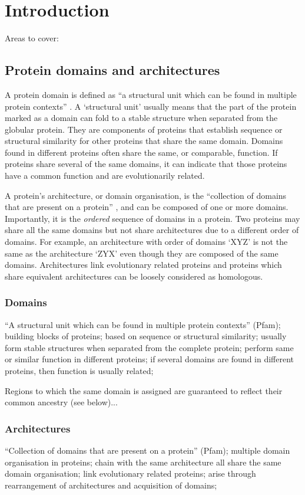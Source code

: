 \section{Introduction}

Areas to cover:

\subsection{Protein domains and architectures}
A protein domain is defined as ``a structural unit which can be found in multiple protein contexts'' \cite{pfamdb}. A `structural unit' usually means that the part of the protein marked as a domain can fold to a stable structure when separated from the globular protein. They are components of proteins that establish sequence or structural similarity for other proteins that share the same domain. Domains found in different proteins often share the same, or comparable, function. If proteins share several of the same domains, it can indicate that those proteins have a common function and are evolutionarily related.

A protein's architecture, or domain organisation, is the ``collection of domains that are present on a protein'' \cite{pfamdb}, and can be composed of one or more domains. Importantly, it is the \textit{ordered} sequence of domains in a protein. Two proteins may share all the same domains but not share architectures due to a different order of domains. For example, an architecture with order of domains `XYZ' is not the same as the architecture `ZYX' even though they are composed of the same domains. Architectures link evolutionary related proteins \cite{fong} and proteins which share equivalent architectures can be loosely considered as homologous. 

\subsubsection*{Domains} ``A structural unit which can be found in multiple protein contexts'' (Pfam); building blocks of proteins; based on sequence or structural similarity; usually form stable structures when separated from the complete protein; perform same or similar function in different proteins; if several domains are found in different proteins, then function is usually related; 

Regions to which the same domain is assigned are guaranteed to reflect their common ancestry (see below)...

\subsubsection*{Architectures} ``Collection of domains that are present on a protein'' (Pfam); multiple domain organisation in proteins; chain with the same architecture all share the same domain organisation; link evolutionary related proteins; arise through rearrangement of architectures and acquisition of domains; 

